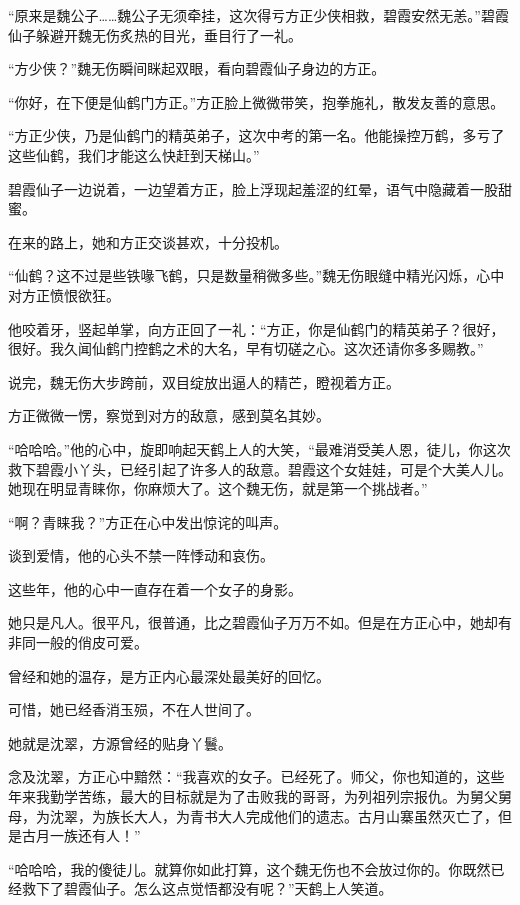 
\begin{this_body}

“原来是魏公子……魏公子无须牵挂，这次得亏方正少侠相救，碧霞安然无恙。”碧霞仙子躲避开魏无伤炙热的目光，垂目行了一礼。

“方少侠？”魏无伤瞬间眯起双眼，看向碧霞仙子身边的方正。

“你好，在下便是仙鹤门方正。”方正脸上微微带笑，抱拳施礼，散发友善的意思。

“方正少侠，乃是仙鹤门的精英弟子，这次中考的第一名。他能操控万鹤，多亏了这些仙鹤，我们才能这么快赶到天梯山。”

碧霞仙子一边说着，一边望着方正，脸上浮现起羞涩的红晕，语气中隐藏着一股甜蜜。

在来的路上，她和方正交谈甚欢，十分投机。

“仙鹤？这不过是些铁喙飞鹤，只是数量稍微多些。”魏无伤眼缝中精光闪烁，心中对方正愤恨欲狂。

他咬着牙，竖起单掌，向方正回了一礼：“方正，你是仙鹤门的精英弟子？很好，很好。我久闻仙鹤门控鹤之术的大名，早有切磋之心。这次还请你多多赐教。”

说完，魏无伤大步跨前，双目绽放出逼人的精芒，瞪视着方正。

方正微微一愣，察觉到对方的敌意，感到莫名其妙。

“哈哈哈。”他的心中，旋即响起天鹤上人的大笑，“最难消受美人恩，徒儿，你这次救下碧霞小丫头，已经引起了许多人的敌意。碧霞这个女娃娃，可是个大美人儿。她现在明显青睐你，你麻烦大了。这个魏无伤，就是第一个挑战者。”

“啊？青睐我？”方正在心中发出惊诧的叫声。

谈到爱情，他的心头不禁一阵悸动和哀伤。

这些年，他的心中一直存在着一个女子的身影。

她只是凡人。很平凡，很普通，比之碧霞仙子万万不如。但是在方正心中，她却有非同一般的俏皮可爱。

曾经和她的温存，是方正内心最深处最美好的回忆。

可惜，她已经香消玉殒，不在人世间了。

她就是沈翠，方源曾经的贴身丫鬟。

念及沈翠，方正心中黯然：“我喜欢的女子。已经死了。师父，你也知道的，这些年来我勤学苦练，最大的目标就是为了击败我的哥哥，为列祖列宗报仇。为舅父舅母，为沈翠，为族长大人，为青书大人完成他们的遗志。古月山寨虽然灭亡了，但是古月一族还有人！”

“哈哈哈，我的傻徒儿。就算你如此打算，这个魏无伤也不会放过你的。你既然已经救下了碧霞仙子。怎么这点觉悟都没有呢？”天鹤上人笑道。


\end{this_body}
